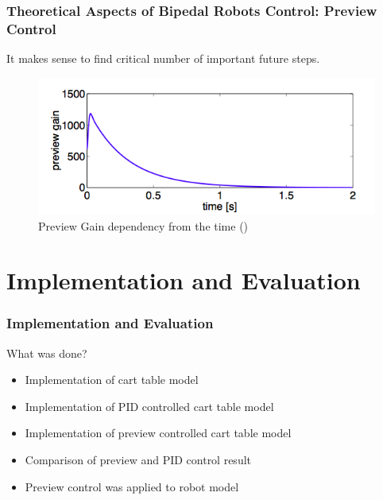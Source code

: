 \documentclass{beamer}
\begin{document}

	\begin{frame}
		\frametitle{Theoretical Aspects of Bipedal Robots Control: Preview Control}
		It makes sense to find critical number of important future steps.
		\begin{figure}[h!]
			\begin{minipage}[H]{\linewidth}
				\centering
				\includegraphics[width=0.7\linewidth]{presentation_images/16}
				\caption{Preview Gain dependency from the time (\cite{kajita2003biped})}
			\end{minipage}
		\end{figure}
	\end{frame}
	

	\section*{Implementation and Evaluation}
	\begin{frame}
		\frametitle{Implementation and Evaluation}
		\begin{block}{What was done?}
			\begin{itemize}
				\item
					Implementation of cart table model
				\item
					Implementation of PID controlled cart table model
				\item
					Implementation of preview controlled cart table model
				\item
					Comparison of preview and PID control result
				\item
					Preview control was applied to robot model
			\end{itemize}
		\end{block}
	\end{frame}

\end{document}
